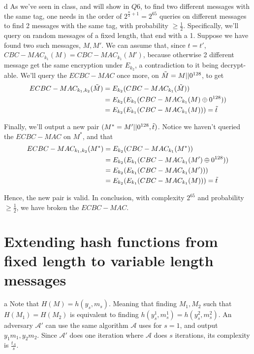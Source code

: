 \documentclass{article}
\begin{document}
\begin{paragraph}
    d As we've seen in class, and will show in $Q6$, to find two different messages with the same tag, one needs in the order of $2^{\frac{n}{2} + 1} = 2^{65}$ queries on different messages to find 2 messages with the same tag, with probability $\geq \frac{1}{2}$. Specifically, we'll query on random messages of a fixed length, that end with a 1. Suppose we have found two such messages, $M, M'$. We can assume that, since $t = t'$, $CBC-MAC_{k_1}(M) = CBC-MAC_{k_1}(M')$, because otherwise 2 different message get the same encryption under $E_{k_2}$, a contradiction to it being decrypt-able. We'll query the $ECBC-MAC$ once more, on $\Tilde{M} = M || 0^{128}$, to get
    \begin{align*}
        ECBC-MAC_{k_1, k_2}(\Tilde{M}) &= E_{k_2}(CBC-MAC_{k_1}(\Tilde{M}))\\
        &= E_{k_2}(E_{k_1}(CBC-MAC_{k_1}(M) \oplus 0^{128}))\\
        &= E_{k_2}(E_{k_1}(CBC-MAC_{k_1}(M))) = \Tilde{t}
    \end{align*}
    
    Finally, we'll output a new pair $(M^* = M' || 0^{128}, \Tilde{t})$. Notice we haven't queried the $ECBC-MAC$ on $M^*$, and that
    \begin{align*}
        ECBC-MAC_{k_1, k_2}(M^*) &= E_{k_2}(CBC-MAC_{k_1}(M^*))\\
        &= E_{k_2}(E_{k_1}(CBC-MAC_{k_1}(M') \oplus 0^{128}))\\
        &= E_{k_2}(E_{k_1}(CBC-MAC_{k_1}(M')))\\
        &= E_{k_2}(E_{k_1}(CBC-MAC_{k_1}(M))) = \Tilde{t}
    \end{align*}
    
    Hence, the new pair is valid. In conclusion, with complexity $2^{65}$ and probability $\geq \frac{1}{2}$, we have broken the $ECBC-MAC$.
\end{paragraph}

\section{Extending hash functions from fixed length to variable length messages}
\begin{paragraph}
	a Note that $H(M) = h(y_s, m_s)$. Meaning that finding $M_1,M_2$ such that $H(M_1) = H(M_2)$
	is equivalent to finding $h(y^1_s, m^1_s) = h(y^2_s, m^2_s)$.
	An adversary $\mathcal{A}'$ can use the same algorithm $\mathcal{A}$ uses for $s = 1$, and output
	$y_1m_1, y_2m_2$.
	Since $\mathcal{A}'$ does one iteration where $\mathcal{A}$ does $s$ iterations, its
	complexity is $\frac{t_A}{s}$.
\end{paragraph}
\end{document}
